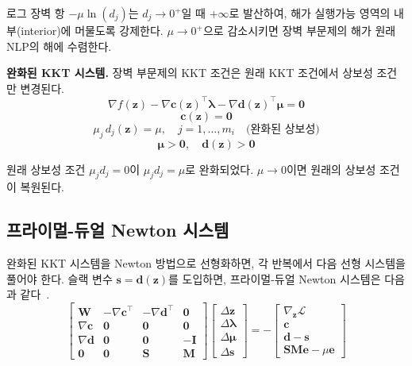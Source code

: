 \documentclass[11pt]{article}
\begin{document}
로그 장벽 항 $-\mu \ln(d_j)$는 $d_j \to 0^+$일 때 $+\infty$로 발산하여, 해가 실행가능 영역의 내부(interior)에 머물도록 강제한다. $\mu \to 0^+$으로 감소시키면 장벽 부문제의 해가 원래 NLP의 해에 수렴한다.

\textbf{완화된 KKT 시스템.} 장벽 부문제의 KKT 조건은 원래 KKT 조건에서 상보성 조건만 변경된다.
%
\[
\nabla f(\mathbf{z}) - \nabla \mathbf{c}(\mathbf{z})^\top \boldsymbol{\lambda} - \nabla \mathbf{d}(\mathbf{z})^\top \boldsymbol{\mu} = \mathbf{0}
\]
%
\[
\mathbf{c}(\mathbf{z}) = \mathbf{0}
\]
%
\begin{equation}\label{eq:perturbed-complementarity}
\mu_j \, d_j(\mathbf{z}) = \mu, \quad j = 1, \ldots, m_i \quad \text{(완화된 상보성)}
\end{equation}
%
\[
\boldsymbol{\mu} > \mathbf{0}, \quad \mathbf{d}(\mathbf{z}) > \mathbf{0}
\]

원래 상보성 조건 $\mu_j d_j = 0$이 $\mu_j d_j = \mu$로 완화되었다. $\mu \to 0$이면 원래의 상보성 조건이 복원된다.

\subsection{프라이멀-듀얼 Newton 시스템}

완화된 KKT 시스템을 Newton 방법으로 선형화하면, 각 반복에서 다음 선형 시스템을 풀어야 한다. 슬랙 변수 $\mathbf{s} = \mathbf{d}(\mathbf{z})$를 도입하면, 프라이멀-듀얼 Newton 시스템은 다음과 같다~\cite{Wachter2006}.
%
\begin{equation}\label{eq:newton-full}
\begin{bmatrix}
\mathbf{W} & -\nabla \mathbf{c}^\top & -\nabla \mathbf{d}^\top & \mathbf{0} \\
\nabla \mathbf{c} & \mathbf{0} & \mathbf{0} & \mathbf{0} \\
\nabla \mathbf{d} & \mathbf{0} & \mathbf{0} & -\mathbf{I} \\
\mathbf{0} & \mathbf{0} & \mathbf{S} & \mathbf{M}
\end{bmatrix}
\begin{bmatrix}
\Delta \mathbf{z} \\
\Delta \boldsymbol{\lambda} \\
\Delta \boldsymbol{\mu} \\
\Delta \mathbf{s}
\end{bmatrix}
= -
\begin{bmatrix}
\nabla_\mathbf{z} \mathcal{L} \\
\mathbf{c} \\
\mathbf{d} - \mathbf{s} \\
\mathbf{S} \mathbf{M} \mathbf{e} - \mu \mathbf{e}
\end{bmatrix}
\end{equation}
\end{document}
